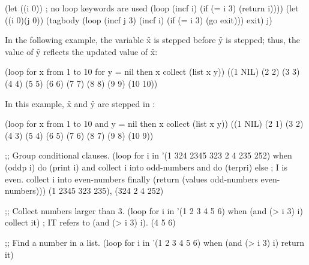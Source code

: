 

\endsubsubsection%

\endsubsection%


\code
 (let ((i 0))                     ; no loop keywords are used
    (loop (incf i) (if (= i 3) (return i)))) 
 (let ((i 0)(j 0))
    (tagbody
      (loop (incf j 3) (incf i) (if (= i 3) (go exit)))
      exit)
    j) 
\endcode


In the following example, the variable \f{x} is stepped
before \f{y} is stepped; thus, the value of \f{y}
reflects the updated value of \f{x}:
 
\code
 (loop for x from 1 to 10 
       for y = nil then x 
       collect (list x y))
\EV ((1 NIL) (2 2) (3 3) (4 4) (5 5) (6 6) (7 7) (8 8) (9 9) (10 10))
\endcode
 
In this example, \f{x} and \f{y} are stepped in :
 
\code
 (loop for x from 1 to 10 
       and y = nil then x 
       collect (list x y))
\EV ((1 NIL) (2 1) (3 2) (4 3) (5 4) (6 5) (7 6) (8 7) (9 8) (10 9))
\endcode

\code
;; Group conditional clauses.
 (loop for i in '(1 324 2345 323 2 4 235 252)
       when (oddp i)
         do (print i)
         and collect i into odd-numbers
         and do (terpri)
       else                              ; I is even.
         collect i into even-numbers
       finally
         (return (values odd-numbers even-numbers)))
\OUT 
{} 
\OUT 
{} 
\OUT 
{} 
\EV (1 2345 323 235), (324 2 4 252)

;; Collect numbers larger than 3.
 (loop for i in '(1 2 3 4 5 6)
       when (and (> i 3) i)
       collect it)                      ; IT refers to (and (> i 3) i).
\EV (4 5 6)
 
;; Find a number in a list.
 (loop for i in '(1 2 3 4 5 6)
       when (and (> i 3) i)
       return it)
     
